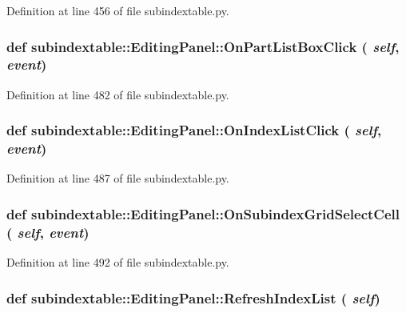 Definition at line 456 of file subindextable.py.\hypertarget{classsubindextable_1_1EditingPanel_f5b2fbab77fb18f61a0c664e78fc54c8}{
\subsubsection[OnPartListBoxClick]{\setlength{\rightskip}{0pt plus 5cm}def subindextable::Editing\-Panel::On\-Part\-List\-Box\-Click ( {\em self},  {\em event})}}
\label{classsubindextable_1_1EditingPanel_f5b2fbab77fb18f61a0c664e78fc54c8}




Definition at line 482 of file subindextable.py.\hypertarget{classsubindextable_1_1EditingPanel_5a577219ca8e2423c9277349afd54de5}{
\subsubsection[OnIndexListClick]{\setlength{\rightskip}{0pt plus 5cm}def subindextable::Editing\-Panel::On\-Index\-List\-Click ( {\em self},  {\em event})}}
\label{classsubindextable_1_1EditingPanel_5a577219ca8e2423c9277349afd54de5}




Definition at line 487 of file subindextable.py.\hypertarget{classsubindextable_1_1EditingPanel_8fd8c0fe15b2c830156fb9c468caa961}{
\subsubsection[OnSubindexGridSelectCell]{\setlength{\rightskip}{0pt plus 5cm}def subindextable::Editing\-Panel::On\-Subindex\-Grid\-Select\-Cell ( {\em self},  {\em event})}}
\label{classsubindextable_1_1EditingPanel_8fd8c0fe15b2c830156fb9c468caa961}




Definition at line 492 of file subindextable.py.\hypertarget{classsubindextable_1_1EditingPanel_0c3755e29c0d8822d4ec8510ba2c0f43}{
\subsubsection[RefreshIndexList]{\setlength{\rightskip}{0pt plus 5cm}def subindextable::Editing\-Panel::Refresh\-Index\-List ( {\em self})}}
\label{classsubindextable_1_1EditingPanel_0c3755e29c0d8822d4ec8510ba2c0f43}




